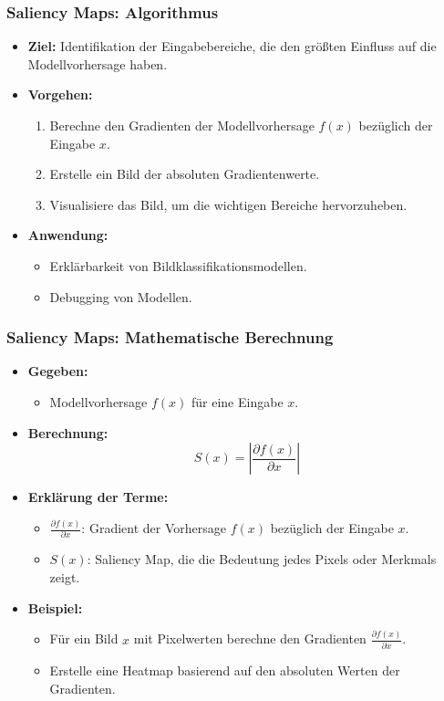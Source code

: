 \documentclass[aspectratio=1610, xcolor=dvipsnames, 9pt]{beamer}
\begin{document}
\begin{frame}
  \frametitle{Saliency Maps: Algorithmus}
  \begin{itemize}
    \item \textbf{Ziel:} Identifikation der Eingabebereiche, die den größten Einfluss auf die Modellvorhersage haben.
    \item \textbf{Vorgehen:}
    \begin{enumerate}
      \item Berechne den Gradienten der Modellvorhersage $f(x)$ bezüglich der Eingabe $x$.
      \item Erstelle ein Bild der absoluten Gradientenwerte.
      \item Visualisiere das Bild, um die wichtigen Bereiche hervorzuheben.
    \end{enumerate}
    \item \textbf{Anwendung:} 
    \begin{itemize}
      \item Erklärbarkeit von Bildklassifikationsmodellen.
      \item Debugging von Modellen.
    \end{itemize}
  \end{itemize}
\end{frame}

\begin{frame}
  \frametitle{Saliency Maps: Mathematische Berechnung}
  \begin{itemize}
    \item \textbf{Gegeben:}
    \begin{itemize}
      \item Modellvorhersage $f(x)$ für eine Eingabe $x$.
    \end{itemize}
    \item \textbf{Berechnung:}
    \[
    S(x) = \left| \frac{\partial f(x)}{\partial x} \right|
    \]
    \item \textbf{Erklärung der Terme:}
    \begin{itemize}
      \item $\frac{\partial f(x)}{\partial x}$: Gradient der Vorhersage $f(x)$ bezüglich der Eingabe $x$.
      \item $S(x)$: Saliency Map, die die Bedeutung jedes Pixels oder Merkmals zeigt.
    \end{itemize}
    \item \textbf{Beispiel:}
    \begin{itemize}
      \item Für ein Bild $x$ mit Pixelwerten berechne den Gradienten $\frac{\partial f(x)}{\partial x}$.
      \item Erstelle eine Heatmap basierend auf den absoluten Werten der Gradienten.
    \end{itemize}
  \end{itemize}
\end{frame}
\end{document}
